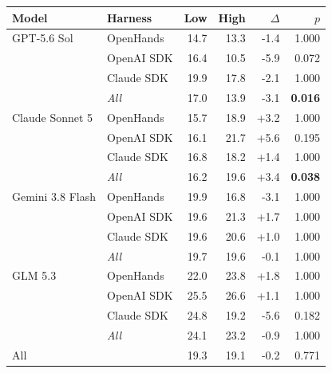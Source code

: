 \begin{tabular}{ll rrr r}
\toprule
Model & Harness & Low & High & $\Delta$ & $p$ \\
\midrule
GPT-5.6 Sol & OpenHands & 14.7 & 13.3 & -1.4 & 1.000 \\
 & OpenAI SDK & 16.4 & 10.5 & -5.9 & 0.072 \\
 & Claude SDK & 19.9 & 17.8 & -2.1 & 1.000 \\
 & \textit{All} & 17.0 & 13.9 & -3.1 & \textbf{0.016} \\
\midrule
Claude Sonnet 5 & OpenHands & 15.7 & 18.9 & +3.2 & 1.000 \\
 & OpenAI SDK & 16.1 & 21.7 & +5.6 & 0.195 \\
 & Claude SDK & 16.8 & 18.2 & +1.4 & 1.000 \\
 & \textit{All} & 16.2 & 19.6 & +3.4 & \textbf{0.038} \\
\midrule
Gemini 3.8 Flash & OpenHands & 19.9 & 16.8 & -3.1 & 1.000 \\
 & OpenAI SDK & 19.6 & 21.3 & +1.7 & 1.000 \\
 & Claude SDK & 19.6 & 20.6 & +1.0 & 1.000 \\
 & \textit{All} & 19.7 & 19.6 & -0.1 & 1.000 \\
\midrule
GLM 5.3 & OpenHands & 22.0 & 23.8 & +1.8 & 1.000 \\
 & OpenAI SDK & 25.5 & 26.6 & +1.1 & 1.000 \\
 & Claude SDK & 24.8 & 19.2 & -5.6 & 0.182 \\
 & \textit{All} & 24.1 & 23.2 & -0.9 & 1.000 \\
\midrule
\multicolumn{2}{l}{All} & 19.3 & 19.1 & -0.2 & 0.771 \\
\bottomrule
\end{tabular}